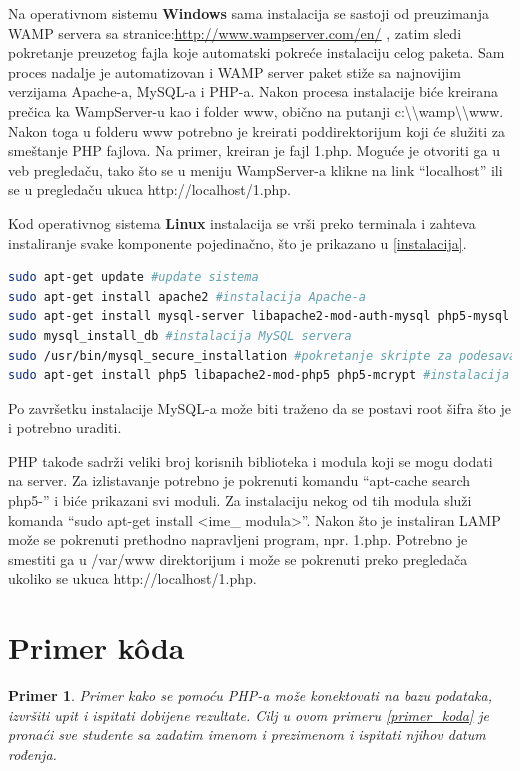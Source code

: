\documentclass[a4paper]{article}
\newtheorem{primer}{Primer}[section]
\begin{document}
{Na operativnom sistemu \textbf{Windows} sama instalacija se sastoji od preuzimanja WAMP servera sa stranice:\url{http://www.wampserver.com/en/} , zatim sledi pokretanje preuzetog fajla koje automatski pokreće instalaciju celog paketa. Sam proces nadalje je automatizovan i WAMP server paket stiže sa najnovijim verzijama Apache-a, MySQL-a i PHP-a. Nakon procesa instalacije biće kreirana prečica ka WampServer-u kao i  folder www, obično na putanji c:\textbackslash \textbackslash wamp\textbackslash \textbackslash www. Nakon toga u folderu www potrebno je kreirati poddirektorijum koji će služiti za smeštanje PHP fajlova. Na primer, kreiran je fajl 1.php. Moguće je otvoriti ga u veb pregledaču, tako što se u meniju WampServer-a klikne na link “localhost” ili se u pregledaču ukuca http://localhost/1.php.

Kod operativnog sistema \textbf{Linux} instalacija se vrši preko terminala i zahteva instaliranje svake komponente pojedinačno, što je prikazano u \ref{instalacija}. 

\begin{lstlisting}[language=bash, caption={Pokretanje instalacije na Linux operativnom sistemu}, label={instalacija}]
sudo apt-get update #update sistema
sudo apt-get install apache2 #instalacija Apache-a
sudo apt-get install mysql-server libapache2-mod-auth-mysql php5-mysql #instalacija MySQL-a
sudo mysql_install_db #instalacija MySQL servera
sudo /usr/bin/mysql_secure_installation #pokretanje skripte za podesavanje MySQL-a
sudo apt-get install php5 libapache2-mod-php5 php5-mcrypt #instalacija PHP-a

\end{lstlisting}
Po završetku instalacije MySQL-a može biti traženo da se postavi root šifra što je i potrebno uraditi.

PHP takođe sadrži veliki broj korisnih biblioteka i modula koji se mogu dodati na  server. Za izlistavanje potrebno je pokrenuti komandu “apt-cache search php5-” i biće prikazani svi moduli. Za instalaciju nekog od tih modula služi komanda “sudo apt-get install <ime\_ modula>”. Nakon što je instaliran LAMP može se pokrenuti prethodno napravljeni program, npr. 1.php. Potrebno je smestiti ga u /var/www direktorijum i može se pokrenuti preko pregledača ukoliko se ukuca http://localhost/1.php. 

\section{Primer k\^{o}da}
\begin{primer}
Primer kako se pomoću PHP-a može konektovati na bazu podataka, izvršiti upit i ispitati dobijene rezultate. Cilj u ovom primeru \ref{primer_koda} je pronaći sve studente sa zadatim imenom i prezimenom i ispitati njihov datum rođenja.
\end{primer}


}
\end{document}

